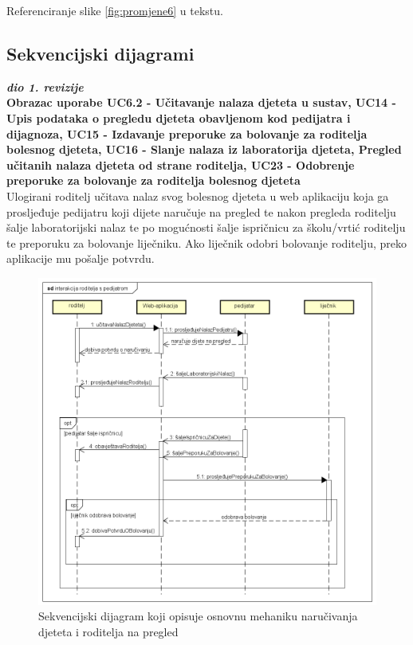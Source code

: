 					Referenciranje slike \ref{fig:promjene6} u tekstu.
					
				
			\subsection{Sekvencijski dijagrami}
				
				\textbf{\textit{dio 1. revizije}}\\
				
					\textbf{Obrazac uporabe UC6.2 - Učitavanje nalaza djeteta u sustav, UC14 - Upis podataka o pregledu djeteta obavljenom kod pedijatra i dijagnoza, UC15 - Izdavanje preporuke za bolovanje za roditelja bolesnog djeteta, UC16 - Slanje nalaza iz laboratorija djeteta, Pregled učitanih nalaza djeteta od strane roditelja, UC23 - Odobrenje preporuke za bolovanje za roditelja bolesnog djeteta}\\
				
				
				Ulogirani roditelj učitava nalaz svog bolesnog djeteta u web aplikaciju koja ga prosljeđuje pedijatru koji dijete naručuje na pregled te nakon pregleda roditelju šalje laboratorijski nalaz te po mogućnosti šalje ispričnicu za školu/vrtić roditelju te preporuku za bolovanje liječniku. Ako liječnik odobri bolovanje roditelju, preko aplikacije mu pošalje potvrdu.
				
				\begin{figure}[H]
					\includegraphics[width=\textwidth]{slike/SDrplW.PNG} %
					\caption{Sekvencijski dijagram koji opisuje osnovnu mehaniku naručivanja djeteta i roditelja na pregled}
					\label{fig:promjene7} %
				\end{figure}
				
